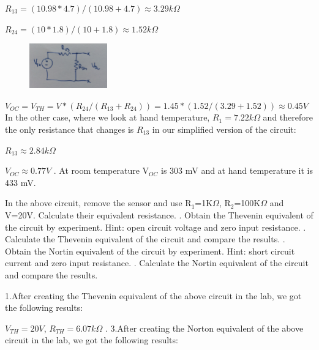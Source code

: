 {\begin{solution}
		$R_{13}=(10.98*4.7)/(10.98+4.7)\approx3.29k\Omega$
		
		$R_{24}=(10*1.8)/(10+1.8)\approx1.52k\Omega$
		
		\begin{figure}[h!]
			\centering
			\includegraphics[width=0.3\textwidth]{images/circuit214.jpg}
		\end{figure}
		
		$V_{OC}=V_{TH}=V*(R_{24}/(R_{13}+R_{24}))=1.45*(1.52/(3.29+1.52))\approx0.45V$
		\\
		In the other case, where we look at hand temperature, $R_{1}=7.22k\Omega$ and therefore the only resistance that changes is $R_{13}$ in our simplified version of the circuit:
		
		$R_{13}\approx2.84k\Omega$
		
		$V_{OC}\approx0.77V$
		. At room temperature V$_{OC}$ is 303 mV and at hand temperature it is 433 mV.
	\end{solution}
	\clearpage
	\begin{problem}
		In the above circuit, remove the sensor and use R\(_{1}\)=1K\(\Omega\), R\(_{2}\)=100K\(\Omega\) and V=20V. Calculate their equivalent resistance.
		. Obtain the Thevenin equivalent of the circuit by experiment. Hint: open circuit voltage and zero input resistance.
		. Calculate the Thevenin equivalent of the circuit and compare the results.
		. Obtain the Nortin equivalent of the circuit by experiment. Hint: short circuit current and zero input resistance.
		. Calculate the Nortin equivalent of the circuit and compare the results.
	\end{problem}
	
	\begin{solution}
		1.After creating the Thevenin equivalent of the above circuit in the lab, we got the following results:
		
		$V_{TH}=20V$, $R_{TH}=6.07k\Omega$
		.
		\newline
		3.After creating the Norton equivalent of the above circuit in the lab, we got the following results:
		

\end{solution}}
